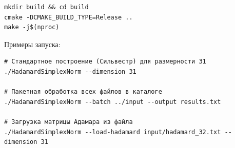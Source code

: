 \documentclass[appendix_A]{subfiles}
\begin{document}
\begin{verbatim}
mkdir build && cd build
cmake -DCMAKE_BUILD_TYPE=Release ..
make -j$(nproc)
\end{verbatim}

Примеры запуска:

\begin{verbatim}
# Стандартное построение (Сильвестр) для размерности 31
./HadamardSimplexNorm --dimension 31

# Пакетная обработка всех файлов в каталоге
./HadamardSimplexNorm --batch ../input --output results.txt

# Загрузка матрицы Адамара из файла
./HadamardSimplexNorm --load-hadamard input/hadamard_32.txt --dimension 31
\end{verbatim}

\newpage
\end{document}
